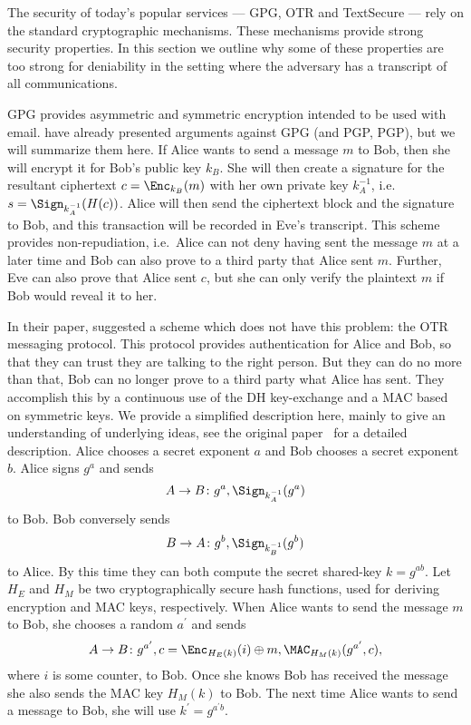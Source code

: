 The security of today's popular services --- \ac{GPG}, \ac{OTR} and TextSecure 
--- rely on the standard cryptographic mechanisms.
These mechanisms provide strong security properties.
In this section we outline why some of these properties are too strong for 
deniability in the setting where the adversary has a transcript of all 
communications.

\ac{GPG} provides asymmetric and symmetric encryption intended to be used with 
email.
\citet{otr2004} have already presented arguments against \ac{GPG} (and 
\acl{PGP}, \acs{PGP}), but we will summarize them here.
If Alice wants to send a message \(m\) to Bob, then she will encrypt it for 
Bob's public key \(k_B\).
She will then create a signature for the resultant ciphertext \(c = \Enc_{k_B}( 
m )\) with her own private key \(k_A^{-1}\), i.e.~\(s = \Sign_{k_A^{-1}}( H(c) 
)\).
Alice will then send the ciphertext block and the signature to Bob, and this 
transaction will be recorded in Eve's transcript.
This scheme provides non-repudiation, i.e.~Alice can not deny having sent the 
message \(m\) at a later time and Bob can also prove to a third party that 
Alice sent \(m\).
Further, Eve can also prove that Alice sent \(c\), but she can only verify the 
plaintext \(m\) if Bob would reveal it to her.

In their paper, \citet{otr2004} suggested a scheme which does not have this 
problem: the \ac{OTR} messaging protocol.
This protocol provides authentication for Alice and Bob, so that they can trust 
they are talking to the right person.
But they can do no more than that, Bob can no longer prove to a third party 
what Alice has sent.
They accomplish this by a continuous use of the \ac{DH} key-exchange and 
a \ac{MAC} based on symmetric keys.
We provide a simplified description here, mainly to give an understanding of 
underlying ideas, see the original paper~\cite{otr2004} for a detailed 
description.
Alice chooses a secret exponent \(a\) and Bob chooses a secret exponent \(b\).
Alice signs \(g^a\) and sends \[
  A\to B\colon g^a, \Sign_{k_A^{-1}}( g^a )
\] to Bob.
Bob conversely sends \[%
  B\to A\colon g^b, \Sign_{k_B^{-1}}( g^b )
\] to Alice.
By this time they can both compute the secret shared-key \(k = g^{ab}\).
Let \(H_E\) and \(H_M\) be two cryptographically secure hash functions, used 
for deriving encryption and \ac{MAC} keys, respectively.
When Alice wants to send the message \(m\) to Bob, she chooses a random 
\(a^\prime\) and sends \[
  A\to B\colon g^{a^\prime}, c = \Enc_{H_E( k )}( i )\oplus m,
  \MAC_{H_M( k )}( g^{a^\prime}, c ),
\] where \(i\) is some counter, to Bob.
Once she knows Bob has received the message she also sends the \ac{MAC} key 
\(H_M( k )\) to Bob.
The next time Alice wants to send a message to Bob, she will use \(k^\prime 
= g^{a^\prime b}\).


